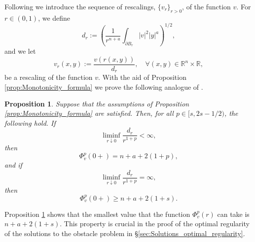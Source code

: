 \documentclass[11pt,reqno]{amsart}
\newtheorem{prop}[thm]{Proposition}
\theoremstyle{definition}
\theoremstyle{remark}
\begin{document}
Following \cite[Definition (6.1)]{Caffarelli_Salsa_Silvestre_2008} we introduce the sequence of rescalings, $\{v_r\}_{r >0}$, of the function $v$. For $r\in (0,1)$, we define
\begin{equation}
\label{eq:d_r}
d_r:=\left(\frac{1}{r^{n+a}}\int_{\partial B_r}|v|^2|y|^a\right)^{1/2},
\end{equation}
and we let
\begin{equation}
\label{eq:Rescaling}
v_r(x,y):=\frac{v(r(x,y))}{d_r},\quad\forall (x,y)\in{\mathbb{R}}^n\times{\mathbb{R}},
\end{equation}
be a rescaling of the function $v$. With the aid of Proposition \ref{prop:Monotonicity_formula} we prove the following analogue of \cite[Lemma 6.1]{Caffarelli_Salsa_Silvestre_2008}.
\begin{prop}
\label{prop:Phi_at_0}
Suppose that the assumptions of Proposition \ref{prop:Monotonicity_formula} are satisfied. Then, for all $p\in [s,2s-1/2)$, the following hold.
If
\begin{equation}
\label{eq:Fraction_d_r_r_power_finite}
\liminf_{r\downarrow 0}\frac{d_r}{r^{1+p}} <\infty,
\end{equation}
then
\begin{equation}
\label{eq:Phi_at_0_p}
\Phi^p_v(0+) = n+a+2(1+p),
\end{equation}
and if
\begin{equation}
\label{eq:Fraction_d_r_r_power_infty}
\liminf_{r\downarrow 0}\frac{d_r}{r^{1+p}} =\infty,
\end{equation}
then
\begin{equation}
\label{eq:Phi_at_0}
\Phi^p_v(0+) \geq n+a+2(1+s).
\end{equation}
\end{prop}

Proposition \ref{prop:Phi_at_0} shows that the smallest value that the function $\Phi^p_v(r)$ can take is $n+a+2(1+s)$. This property is crucial in the proof of the optimal regularity of the solutions to the obstacle problem in \S \ref{sec:Solutions_optimal_regularity}.
\end{document}
